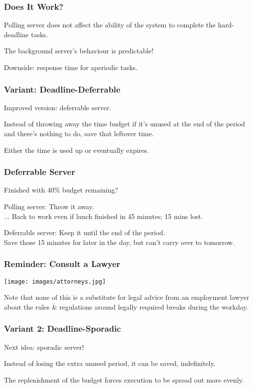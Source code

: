\begin{frame}
\frametitle{Does It Work?}
Polling server does not affect the ability of the system to complete the hard-deadline tasks.

The background server's behaviour is predictable!

Downside: response time for aperiodic tasks.

\end{frame}

\begin{frame}
\frametitle{Variant: Deadline-Deferrable}

Improved version: deferrable server.

Instead of throwing away the time budget if it's unused at the end of the period and there's nothing to do, save that leftover time.

Either the time is used up or eventually expires.

\end{frame}

\begin{frame}
\frametitle{Deferrable Server}
Finished with 40\% budget remaining?

Polling server: Throw it away.\\
\quad... Back to work even if lunch finished in 45 minutes; 15 mins lost.

Deferrable server: Keep it until the end of the period.\\
\quad Save those 15 minutes for later in the day, but can't carry over to tomorrow.

\end{frame}

\begin{frame}
\frametitle{Reminder: Consult a Lawyer}

\begin{center}
	\texttt{[image: images/attorneys.jpg]}
\end{center}

Note that none of this is a substitute for legal advice from an employment lawyer about the rules \& regulations around legally required breaks during the workday.

\end{frame}

\begin{frame}
\frametitle{Variant 2: Deadline-Sporadic}

Next idea: sporadic server!


Instead of losing the extra unused period, it can be saved, indefinitely. 

The replenishment of the budget forces execution to be spread out more evenly.

\end{frame}

